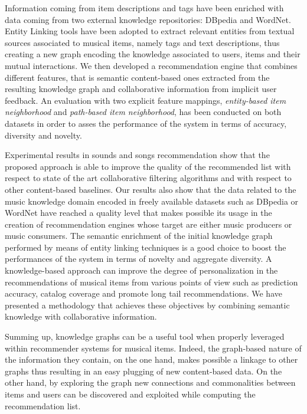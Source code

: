Information coming from item descriptions and tags have been %
enriched with data coming from two external knowledge repositories: DBpedia and WordNet. Entity Linking tools have been adopted to extract relevant entities from textual sources associated to musical items, namely tags and text descriptions, thus creating a new graph encoding the knowledge associated to users, items and their mutual interactions. We then developed a recommendation engine that combines different features, that is semantic content-based ones extracted from the resulting knowledge graph and collaborative information from implicit user feedback. An evaluation with two explicit feature mappings, \textit{entity-based item neighborhood} and \textit{path-based item neighborhood}, has been conducted on both datasets in order to asses the performance of the system in terms of accuracy, diversity and novelty. 

Experimental results in sounds and songs recommendation show that the proposed approach is able to improve the quality of the recommended list with respect to state of the art collaborative filtering algorithms and with respect to other content-based baselines. Our results also show that the data related to the music knowledge domain encoded in freely available datasets such as DBpedia or WordNet have reached a quality level that makes possible its usage in the creation of recommendation engines whose target are either music producers or music consumers. The semantic enrichment of the initial knowledge graph performed by means of entity linking techniques is a good choice to boost the performances of the system in terms of novelty and aggregate diversity. A knowledge-based approach can improve the degree of personalization in the recommendations of musical items from various points of view such as prediction accuracy, catalog coverage and promote long tail recommendations. We have presented a methodology that achieves these objectives by combining semantic knowledge with collaborative information. 

Summing up, knowledge graphs can be a useful tool when properly leveraged within recommender systems for musical items. Indeed, the graph-based nature of the information they contain, on the one hand, makes possible a linkage to other graphs thus resulting in an easy plugging of new content-based data. On the other hand, by exploring the graph new connections and commonalities between items and users can be discovered and exploited while computing the recommendation list.


